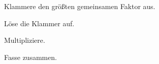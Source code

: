 \setcounter{aufgabe}{43}


\begin{kbaufgabe}{Klammere den größten gemeinsamen Faktor aus.}
\begin{kbblock}
\end{kbblock}
\end{kbaufgabe}


\begin{kbaufgabe}{Löse die Klammer auf.}
\begin{kbblock}
\end{kbblock}
\end{kbaufgabe}


\begin{kbaufgabe}{Multipliziere.}
\begin{kbblock}
\end{kbblock}
\end{kbaufgabe}


\begin{kbaufgabe}{}
\begin{kbblock}
\kbantwort{\kbfeld}
\end{kbblock}
\end{kbaufgabe}


\begin{kbaufgabe}{Fasse zusammen.}
\begin{kbblock}
\end{kbblock}
\end{kbaufgabe}
